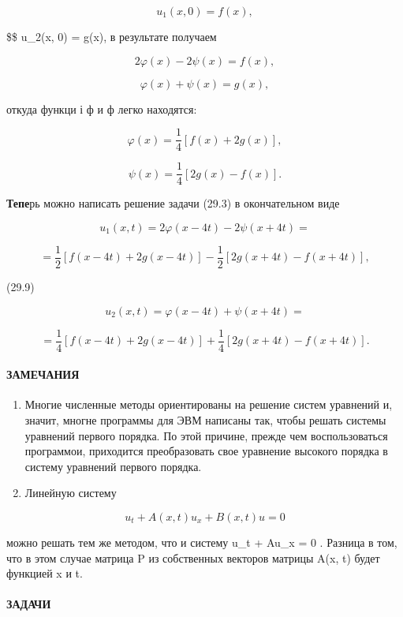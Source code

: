 \documentclass[
  ukrainian,
]{article}
\begin{document}
\[
u_1(x, 0) = f(x),
\]

\$\$ u\_2(x, 0) = g(x), в результате получаем

\[
2\varphi(x) - 2\psi(x) = f(x),
\]

\[
\varphi(x) + \psi(x) = g(x),
\]

откуда функци і ф и ф легко находятся:

\[
\varphi(x) = \frac{1}{4} \left[ f(x) + 2g(x) \right],
\]

\[
\psi(x) = \frac{1}{4} \left[ 2g(x) - f(x) \right].
\]

\textbf{Тепе}рь можно написать решение задачи (29.3) в окончательном
виде

\[
u_{1}(x, t) = 2\varphi(x-4t) - 2\psi(x+4t) =
\]

\[
= \frac{1}{2} \left[ f(x-4t) + 2g(x-4t) \right] - \frac{1}{2} \left[ 2g(x+4t) - f(x+4t) \right],
\]

(29.9)

\[
u_{2}(x, t) = \varphi(x-4t) + \psi(x+4t) =
\]

\[
= \frac{1}{4} \left[ f(x-4t) + 2g(x-4t) \right] + \frac{1}{4} \left[ 2g(x+4t) - f(x+4t) \right].
\]

\paragraph{ЗАМЕЧАНИЯ}\label{ux437ux430ux43cux435ux447ux430ux43dux438ux44f-5}

\begin{enumerate}
\def\labelenumi{\arabic{enumi}.}
\item
  Многие численные методы ориентированы на решение систем уравнений и,
  значит, многне программы для ЭВМ написаны так, чтобы решать системы
  уравнений первого порядка. По этой причине, прежде чем воспользоваться
  программои, приходится преобразовать свое уравнение высокого порядка в
  систему уравнений первого порядка.
\item
  Линейную систему
\end{enumerate}

\[
u_t + A(x, t) u_x + B(x, t) u = 0
\]

можно решать тем же методом, что и систему u\_t + Au\_x = 0 . Разница в
том, что в этом случае матрица P из собственных векторов матрицы A(x, t)
будет функцией x и t.

\paragraph{ЗАДАЧИ}\label{ux437ux430ux434ux430ux447ux438-5}
\end{document}
